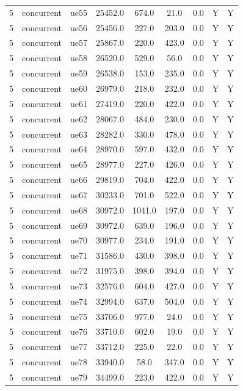 \begin{table}[ht]
\begin{tabular}{|c|c|c|c|c|c|c|c|c|}
5 & concurrent & ue55 & 25452.0 & 674.0 & 21.0 & 0.0 & Y & Y \\
5 & concurrent & ue56 & 25456.0 & 227.0 & 203.0 & 0.0 & Y & Y \\
5 & concurrent & ue57 & 25867.0 & 220.0 & 423.0 & 0.0 & Y & Y \\
5 & concurrent & ue58 & 26520.0 & 529.0 & 56.0 & 0.0 & Y & Y \\
5 & concurrent & ue59 & 26538.0 & 153.0 & 235.0 & 0.0 & Y & Y \\
5 & concurrent & ue60 & 26979.0 & 218.0 & 232.0 & 0.0 & Y & Y \\
5 & concurrent & ue61 & 27419.0 & 220.0 & 422.0 & 0.0 & Y & Y \\
5 & concurrent & ue62 & 28067.0 & 484.0 & 230.0 & 0.0 & Y & Y \\
5 & concurrent & ue63 & 28282.0 & 330.0 & 478.0 & 0.0 & Y & Y \\
5 & concurrent & ue64 & 28970.0 & 597.0 & 432.0 & 0.0 & Y & Y \\
5 & concurrent & ue65 & 28977.0 & 227.0 & 426.0 & 0.0 & Y & Y \\
5 & concurrent & ue66 & 29819.0 & 704.0 & 422.0 & 0.0 & Y & Y \\
5 & concurrent & ue67 & 30233.0 & 701.0 & 522.0 & 0.0 & Y & Y \\
5 & concurrent & ue68 & 30972.0 & 1041.0 & 197.0 & 0.0 & Y & Y \\
5 & concurrent & ue69 & 30972.0 & 639.0 & 196.0 & 0.0 & Y & Y \\
5 & concurrent & ue70 & 30977.0 & 234.0 & 191.0 & 0.0 & Y & Y \\
5 & concurrent & ue71 & 31586.0 & 430.0 & 398.0 & 0.0 & Y & Y \\
5 & concurrent & ue72 & 31975.0 & 398.0 & 394.0 & 0.0 & Y & Y \\
5 & concurrent & ue73 & 32576.0 & 604.0 & 427.0 & 0.0 & Y & Y \\
5 & concurrent & ue74 & 32994.0 & 637.0 & 504.0 & 0.0 & Y & Y \\
5 & concurrent & ue75 & 33706.0 & 977.0 & 24.0 & 0.0 & Y & Y \\
5 & concurrent & ue76 & 33710.0 & 602.0 & 19.0 & 0.0 & Y & Y \\
5 & concurrent & ue77 & 33712.0 & 225.0 & 22.0 & 0.0 & Y & Y \\
5 & concurrent & ue78 & 33940.0 & 58.0 & 347.0 & 0.0 & Y & Y \\
5 & concurrent & ue79 & 34499.0 & 223.0 & 422.0 & 0.0 & Y & Y \\

\end{tabular}
\end{table}
